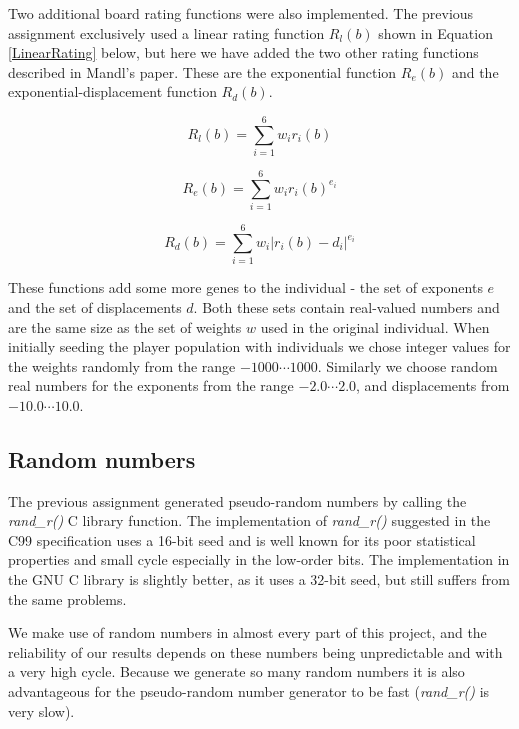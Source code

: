 \documentclass[a4paper,11pt]{article}
\begin{document}
Two additional board rating functions were also implemented.
The previous assignment exclusively used a linear rating function $R_l(b)$
shown in Equation \ref{LinearRating} below, but here we have added the two
other rating functions described in Mandl's paper.
These are the exponential function $R_e(b)$ and the exponential-displacement
function $R_d(b)$.


\begin{equation}
\label{LinearRating}
  R_l(b) = \sum^6_{i=1} w_ir_i(b)
\end{equation}

\begin{equation}
\label{ExponentialRating}
  R_e(b) = \sum^6_{i=1} w_ir_i(b)^{e_i}
\end{equation}

\begin{equation}
\label{DisplacementRating}
  R_d(b) = \sum^6_{i=1} w_i \lvert r_i(b) - d_i \rvert ^{e_i}
\end{equation}

These functions add some more genes to the individual - the set of exponents
$e$ and the set of displacements $d$.
Both these sets contain real-valued numbers and are the same size as the set of
weights $w$ used in the original individual.
When initially seeding the player population with individuals we chose integer
values for the weights randomly from the range $-1000 \cdots 1000$.
Similarly we choose random real numbers for the exponents from the range
$-2.0 \cdots 2.0$, and displacements from $-10.0 \cdots 10.0$.

\subsection{Random numbers}

The previous assignment generated pseudo-random numbers by calling the
\emph{rand\_r()} C library function.
The implementation of \emph{rand\_r()} suggested in the C99 specification
\cite{C99} uses a 16-bit seed and is well known for its poor statistical
properties and small cycle especially in the low-order bits.
The implementation in the GNU C library is slightly better, as it uses a 32-bit
seed, but still suffers from the same problems.

We make use of random numbers in almost every part of this project, and the
reliability of our results depends on these numbers being unpredictable and with
a very high cycle.
Because we generate so many random numbers it is also advantageous for the
pseudo-random number generator to be fast (\emph{rand\_r()} is very slow).
\end{document}
